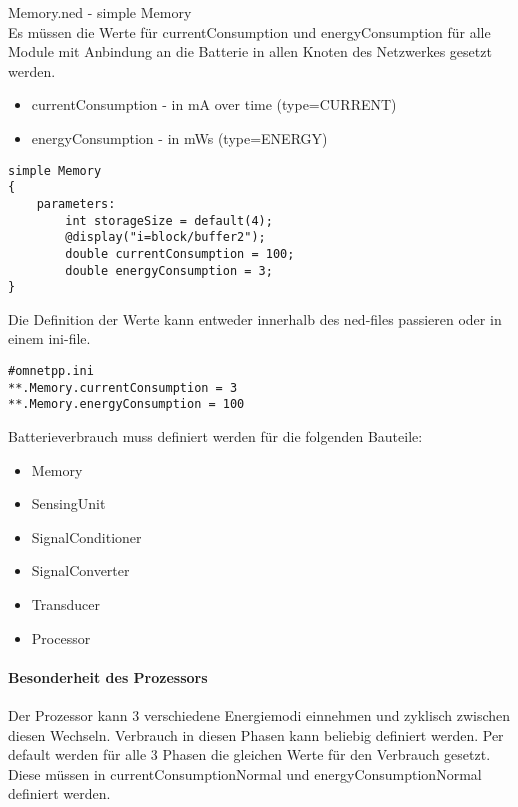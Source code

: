Memory.ned - simple Memory\\
Es müssen die Werte für currentConsumption und energyConsumption für alle Module mit Anbindung an die Batterie in allen Knoten des Netzwerkes gesetzt werden.
\begin{itemize}
\item currentConsumption - in mA over time (type=CURRENT)
\item energyConsumption - in mWs (type=ENERGY)
\end{itemize}

\begin{minipage}{\textwidth}
\begin{lstlisting}
simple Memory
{
    parameters:
        int storageSize = default(4);
        @display("i=block/buffer2");
        double currentConsumption = 100;
    	double energyConsumption = 3;
}
\end{lstlisting}
\end{minipage}

Die Definition der Werte kann entweder innerhalb des ned-files passieren oder in einem ini-file.

\begin{minipage}{\textwidth}
\begin{lstlisting}
#omnetpp.ini
**.Memory.currentConsumption = 3
**.Memory.energyConsumption = 100
\end{lstlisting}
\end{minipage}

Batterieverbrauch muss definiert werden für die folgenden Bauteile:
\begin{itemize}
\item Memory
\item SensingUnit
\item SignalConditioner
\item SignalConverter
\item Transducer
\item Processor
\end{itemize}

\paragraph{Besonderheit des Prozessors}

Der Prozessor kann 3 verschiedene Energiemodi einnehmen und zyklisch zwischen diesen Wechseln. Verbrauch in diesen Phasen kann beliebig definiert werden. Per default werden für alle 3 Phasen die gleichen Werte für den Verbrauch gesetzt. Diese müssen in currentConsumptionNormal und energyConsumptionNormal definiert werden.

